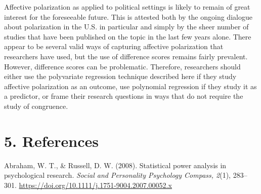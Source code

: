 \documentclass[authordate, meta, issue]{jote-new-article}
\begin{document}
	Affective polarization as applied to political settings is likely to remain of great interest for the foreseeable future. This is attested both by the ongoing dialogue about polarization in the U.S. in particular and simply by the sheer number of studies that have been published on the topic in the last few years alone. There appear to be several valid ways of capturing affective polarization that researchers have used, but the use of difference scores remains fairly prevalent. However, difference scores can be problematic. Therefore, researchers should either use the polyvariate regression technique described here if they study affective polarization as an outcome, use polynomial regression if they study it as a predictor, or frame their research questions in ways that do not require the study of congruence.



































































	\section{5. References}



	Abraham, W. T., \& Russell, D. W. (2008). Statistical power analysis in psychological research. \emph{Social and Personality Psychology Compass, 2}(1), 283--301. \url{https://doi.org/10.1111/j.1751-9004.2007.00052.x}  
\end{document}
